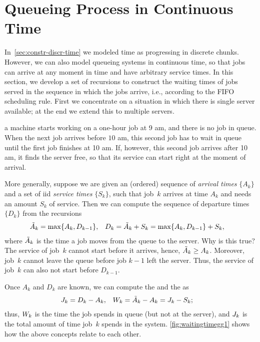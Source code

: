 \documentclass[stochastic-or.tex]{subfiles}
\begin{document}
\section{Queueing Process in Continuous Time}
\label{sec:constr-gg1-queu}

In~\cref{sec:constr-discr-time} we modeled time as progressing in discrete chunks.
However, we can also model queueing systems in continuous time, so that jobs can arrive at any moment in time and have arbitrary service times.
In this section, we develop a set of recursions to construct the waiting times of jobs served in the sequence in which the jobs arrive, i.e., according to the FIFO scheduling rule.
First we concentrate on a situation in which there is single server available; at the end we extend this to multiple servers.


 a machine starts working on a one-hour job at 9 am, and there is no job in queue.
When the next job arrives before $10$ am, this second job has to wait in queue until the first job finishes at 10 am.
If, however, this second job arrives after 10 am, it finds the server free, so that its service can start right at the moment of arrival.

More generally, suppose we are given an (ordered) sequence of \emph{arrival times} $\{A_{k}\}$ and a set of iid \emph{service times} $\{S_{k}\}$, such that job~$k$ arrives at time $A_{k}$ and needs an amount $S_{k}$ of service.
Then we can compute the sequence of departure times $\{D_{k}\}$ from the recursions
\begin{align}\label{eq:qc-3}
\tilde A_{k}&= \max\{A_k, D_{k-1}\}, & D_{k} &= \tilde A_{k} +S_k = \max\{A_{k}, D_{k-1}\} + S_{k},
\end{align}
where $\tilde A_{k}$ is the time a job moves from the queue to the server.
Why is this true?
The service of job~$k$ cannot start before it arrives, hence,  $\tilde A_k \geq A_k$.
Moreover,  job~$k$ cannot leave the queue before job $k-1$ left the server. Thus, the service of job~$k$ can also not start before $D_{k-1}$.

Once $A_{k}$ and $D_{k}$ are known, we can compute the  and the   as
\begin{align*}
J_k &= D_{k} - A_k, & W_k &= \tilde A_k - A_k = J_{k} - S_{k};
 \end{align*}
 thus, $W_{k}$ is the time the job spends in queue (but not at the server), and $J_{k}$ is the total amount of time job~$k$ spends in the system.
\cref{fig:waitingtimegg1} shows how the above concepts relate to each other.
\end{document}
